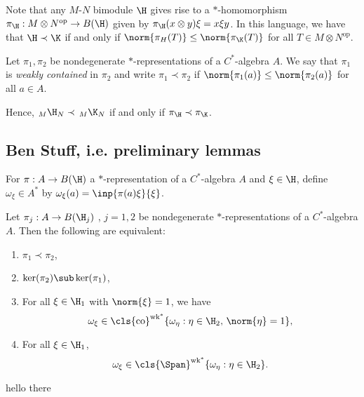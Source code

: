 \documentclass[12pt]{article}
\begin{document}
Note that any $ M $-$ N $ bimodule $ \H $ gives rise to a $ * $-homomorphism $ \pi_{\H}: M \otimes N^{\text{op}}\to B(\H) $ given by $ \pi_{\H}(x \otimes y) \xi = x \xi y $. In this language, we have that $ \H \prec \K $ if and only if $ \norm{\pi_{H}(T)} \leq \norm{\pi_{\K}(T)} $ for all $ T\in M \otimes N^{\text{op}} $.

\begin{definition}
    Let $ \pi_{1}, \pi_{2} $ be nondegenerate $ * $-representations of a $ C^{*} $-algebra $ A $. We say that $ \pi_{1} $ is \textit{weakly contained} in $ \pi_{2} $ and write $ \pi_{1}\prec \pi_{2}$ if $ \norm{\pi_{1}(a)}\leq \norm{\pi_{2}(a)} $ for all $ a\in A $.
\end{definition}

Hence, $ _M\H_N \prec\, _M\K_N $ if and only if $ \pi_{\H} \prec \pi_{\K} $.





\subsection{Ben Stuff, i.e. preliminary lemmas}

For $ \pi:A\to B(\H) $ a $ * $-representation of a $ C^{*} $-algebra $ A $ and $ \xi\in \H $, define $ \omega_{\xi}\in A^{*} $ by $ \omega_{\xi}(a) = \inp{\pi(a) \xi}{\xi} $.

\begin{theorem}
    Let $ \pi_{j}:A\to B(\H_{j}) $ , $ j=1,2 $ be nondegenerate $ * $-representations of a $ C^{*} $-algebra $ A $. Then the following are equivalent:
    \begin{enumerate}
        \item $ \pi_{1}\prec \pi_{2} $,
        \item $ \ker(\pi_{2})\sub \ker(\pi_{1}) $,
        \item For all $ \xi\in \H_{1} $ with $ \norm{\xi} = 1 $, we have 
            \[
                \omega_{\xi}\in \cls{\text{co}}^{\text{wk}^{*}}\{ \omega_{\eta}: \eta\in \H_{2},\, \norm{\eta}=1\},
            \]
        \item For all $ \xi\in \H_{1} $,
            \[
                \omega_{\xi}\in \cls{\Span}^{\text{wk}^{*}}\{ \omega_{\eta}: \eta\in \H_{2}\}.
            \]
    \end{enumerate}

\end{theorem}
hello there
\end{document}
